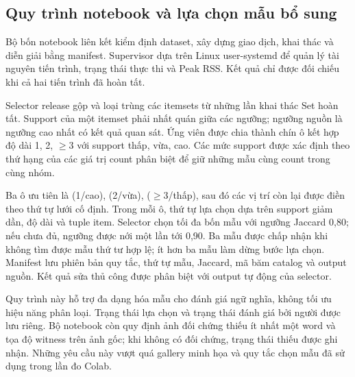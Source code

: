 \documentclass[conference,a4paper]{IEEEtran}
\begin{document}
\subsection{Quy trình notebook và lựa chọn mẫu bổ sung}
Bộ bốn notebook liên kết kiểm định dataset, xây dựng giao dịch, khai thác
và diễn giải bằng manifest. Supervisor dựa trên Linux user-systemd để
quản lý tài nguyên tiến trình, trạng thái thực thi và Peak RSS. Kết quả
chỉ được đối chiếu khi cả hai tiến trình đã hoàn tất.

Selector release gộp và loại trùng các itemsets từ những lần khai thác
Set hoàn tất. Support của một itemset phải nhất quán giữa các ngưỡng;
ngưỡng nguồn là ngưỡng cao nhất có kết quả quan sát. Ứng viên được chia
thành chín ô kết hợp độ dài 1, 2, $\geq3$ với support thấp, vừa, cao.
Các mức support được xác định theo thứ hạng của các giá trị count phân
biệt để giữ những mẫu cùng count trong cùng nhóm.

Ba ô ưu tiên là (1/cao), (2/vừa), ($\geq3$/thấp), sau đó các vị trí còn
lại được điền theo thứ tự lưới cố định. Trong mỗi ô, thứ tự lựa chọn dựa
trên support giảm dần, độ dài và tuple item. Selector chọn tối đa bốn
mẫu với ngưỡng Jaccard 0,80; nếu chưa đủ, ngưỡng được nới một lần tới
0,90. Ba mẫu được chấp nhận khi không tìm được mẫu thứ tư hợp lệ; ít
hơn ba mẫu làm dừng bước lựa chọn. Manifest lưu phiên bản quy tắc, thứ
tự mẫu, Jaccard, mã băm catalog và output nguồn. Kết quả sửa thủ công
được phân biệt với output tự động của selector.

Quy trình này hỗ trợ đa dạng hóa mẫu cho đánh giá ngữ nghĩa, không tối
ưu hiệu năng phân loại. Trạng thái lựa chọn và trạng thái đánh giá bởi
người được lưu riêng. Bộ notebook còn quy định ảnh đối chứng thiếu ít
nhất một word và tọa độ witness trên ảnh gốc; khi không có đối chứng,
trạng thái thiếu được ghi nhận. Những yêu cầu này vượt quá gallery minh
họa và quy tắc chọn mẫu đã sử dụng trong lần đo Colab.
\end{document}
